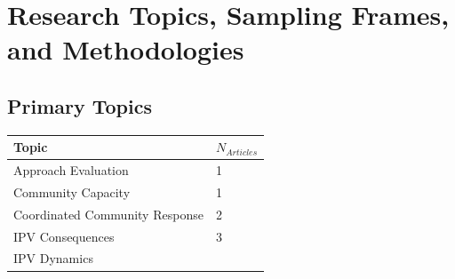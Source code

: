 \documentclass[]{tufte-handout}
\begin{document}
\newpage

\section{Research Topics, Sampling Frames, and
Methodologies}\label{research-topics-sampling-frames-and-methodologies}

\subsection{Primary Topics}\label{primary-topics}

\begin{longtable}[]{@{}ll@{}}
\toprule
\begin{minipage}[b]{0.50\columnwidth}\raggedright\strut
Topic\strut
\end{minipage} & \begin{minipage}[b]{0.21\columnwidth}\raggedright\strut
\(N_{Articles}\)\strut
\end{minipage}\tabularnewline
\midrule
\endhead
\begin{minipage}[t]{0.50\columnwidth}\raggedright\strut
Approach Evaluation\strut
\end{minipage} & \begin{minipage}[t]{0.21\columnwidth}\raggedright\strut
1\strut
\end{minipage}\tabularnewline
\begin{minipage}[t]{0.50\columnwidth}\raggedright\strut
Community Capacity\strut
\end{minipage} & \begin{minipage}[t]{0.21\columnwidth}\raggedright\strut
1\strut
\end{minipage}\tabularnewline
\begin{minipage}[t]{0.50\columnwidth}\raggedright\strut
Coordinated Community Response\strut
\end{minipage} & \begin{minipage}[t]{0.21\columnwidth}\raggedright\strut
2\strut
\end{minipage}\tabularnewline
\begin{minipage}[t]{0.50\columnwidth}\raggedright\strut
IPV Consequences\strut
\end{minipage} & \begin{minipage}[t]{0.21\columnwidth}\raggedright\strut
3\strut
\end{minipage}\tabularnewline
\begin{minipage}[t]{0.50\columnwidth}\raggedright\strut
IPV Dynamics\strut

\end{minipage}
\end{longtable}
\end{document}
